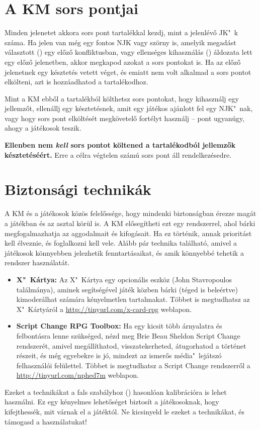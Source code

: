 \section{A KM sors pontjai}

Minden jelenetet akkora sors pont tartalékkal kezdj, mint a jelenlévő JK"~k száma. Ha jelen van még egy fontos NJK vagy szörny is, amelyik megadást választott () egy előző konfliktusban, vagy ellenséges kihasználás () áldozata lett egy előző jelenetben, akkor megkapod azokat a sors pontokat is. Ha az előző jelenetnek egy késztetés vetett véget, és emiatt nem volt alkalmad a sors pontot elkölteni, azt is hozzáadhatod a tartalékodhoz.


Mint a KM ebből a tartalékból költhetsz sors pontokat, hogy kihasználj egy jellemzőt, ellenállj egy késztetésnek, amit egy játékos ajánlott fel egy NJK"~nak, vagy hogy sors pont elköltését megkövetelő fortélyt használj -- pont ugyanúgy, ahogy a játékosok teszik.

\textbf{Ellenben nem \emph{kell} sors pontot költened a tartalékodból jellemzők késztetéséért.} Erre a célra végtelen számú sors pont áll rendelkezésedre.

\section{Biztonsági technikák}

A KM és a játékosok közös felelőssége, hogy mindenki biztonságban érezze magát a játékban és az asztal körül is. A KM elősegítheti ezt egy rendszerrel, ahol bárki megfogalmazhatja az aggodalmait és kifogásait. Ha ez történik, annak prioritást kell élveznie, és foglalkozni kell vele. Alább pár technika található, amivel a játékosok könnyebben jelezhetik fenntartásaikat, és amik könnyebbé tehetik a rendszer használatát.

\begin{itemize}
    \item \textbf{X"~Kártya:} Az X"~Kártya egy opcionális eszköz (John Stavropoulos találmánya), aminek segítségével játék közben bárki (téged is beleértve) kimoderálhat számára kényelmetlen tartalmakat. Többet is megtudhatsz az X"~Kártyáról a \url{http://tinyurl.com/x-card-rpg} weblapon.
    \item \textbf{Script Change RPG Toolbox:} Ha egy kicsit több árnyalatra és felbontásra lenne szükséged, nézd meg Brie Beau Sheldon Script Change rendszerét, amivel megállíthatod, visszatekerheted, átugorhatod a történet részeit, és még egyebekre is jó, mindezt az ismerős média"~lejátszó felhasználói felülettel. Többet is megtudhatsz a Script Change rendszerről a \url{http://tinyurl.com/nphed7m} weblapon.
\end{itemize}

Ezeket a technikákat a fals szabályhoz () hasonlóan kalibrációra is lehet használni. Ez egy kényelmes lehetőséget biztosít a játékosoknak, hogy kifejthessék, mit várnak el a játéktól. Ne kicsinyeld le ezeket a technikákat, és támogasd a használatukat!

